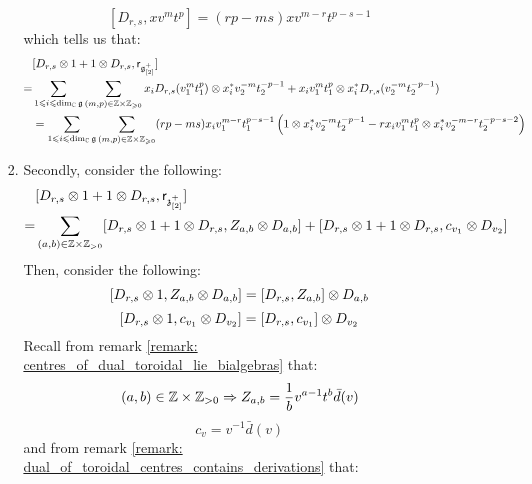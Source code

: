 \begin{remark}
\begin{enumerate}
\begin{enumerate}
\begin{enumerate}
                                $$[D_{r, s}, x v^m t^p] = (rp - ms) x v^{m - r} t^{p - s - 1}$$
                            which tells us that:
                                $$
                                    \begin{aligned}
                                        & [D_{r, s} \tensor 1 + 1 \tensor D_{r, s}, \sfr_{\g_{[2]}^+}]
                                        \\
                                        = & \sum_{1 \leq i \leq \dim_{\bbC} \g} \sum_{(m, p) \in \Z \x \Z_{\geq 0}} x_i D_{r, s}(v_1^m t_1^p) \tensor x_i^* v_2^{-m} t_2^{-p - 1} + x_i v_1^m t_1^p \tensor x_i^* D_{r, s}(v_2^{-m} t_2^{-p - 1})
                                        \\
                                        & = \sum_{1 \leq i \leq \dim_{\bbC} \g} \sum_{(m, p) \in \Z \x \Z_{\geq 0}} (rp - ms) x_i v_1^{m - r} t_1^{p - s - 1} \left( 1 \tensor x_i^* v_2^{-m} t_2^{-p - 1} - r x_i v_1^m t_1^p \tensor x_i^* v_2^{-m - r} t_2^{-p - s - 2} \right)
                                    \end{aligned}
                                $$
                            \item Secondly, consider the following:
                                $$
                                    \begin{aligned}
                                        & [D_{r, s} \tensor 1 + 1 \tensor D_{r, s}, \sfr_{\z_{[2]}^+}]
                                        \\
                                        = & \sum_{(a, b) \in \Z \x \Z_{> 0}} [D_{r, s} \tensor 1 + 1 \tensor D_{r, s}, Z_{a, b} \tensor D_{a, b}] + [D_{r, s} \tensor 1 + 1 \tensor D_{r, s}, c_{v_1} \tensor D_{v_2}]
                                    \end{aligned}
                                $$
                            Then, consider the following:
                                $$[D_{r, s} \tensor 1, Z_{a, b} \tensor D_{a, b}] = [D_{r, s}, Z_{a, b}] \tensor D_{a, b}$$
                                $$[D_{r, s} \tensor 1, c_{v_1} \tensor D_{v_2}] = [D_{r, s}, c_{v_1}] \tensor D_{v_2}$$
                            Recall from remark \ref{remark: centres_of_dual_toroidal_lie_bialgebras} that:
                                $$(a, b) \in \Z \x \Z_{> 0} \implies Z_{a, b} = \frac1b v^{a - 1} t^b \bar{d}(v)$$
                                $$c_v = v^{-1} \bar{d}(v)$$
                            and from remark \ref{remark: dual_of_toroidal_centres_contains_derivations} that:

\end{enumerate}
\end{enumerate}
\end{enumerate}
\end{remark}
